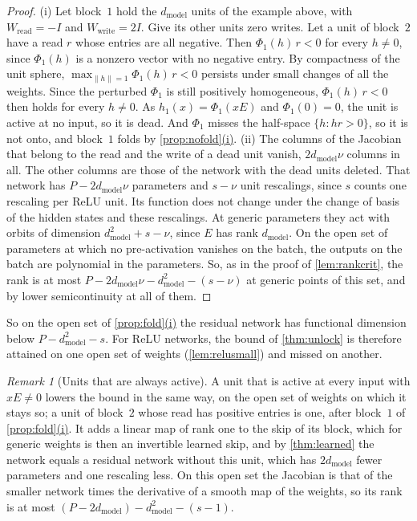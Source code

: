 \documentclass[10pt]{article}
\theoremstyle{definition}
\theoremstyle{remark}
\newtheorem{remark}[theorem]{Remark}
\newcommand{\Wread}{W_{\mathrm{read}}}
\newcommand{\Wwrite}{W_{\mathrm{write}}}
\newcommand{\dm}{d_{\mathrm{model}}}
\newcommand{\norm}[1]{\lVert #1\rVert}
\DeclareRobustCommand{\cpref}[2]{\hyperref[#1:#2]{\cref*{#1}(#2)}}
\begin{document}
\begin{proof}
(i) Let block~$1$ hold the $\dm$ units of the example above, with $\Wread = -I$ and $\Wwrite = 2I$. Give its other units zero writes. Let a unit of block~$2$ have a read $r$ whose entries are all negative. Then $\Phi_1(h)\,r < 0$ for every $h \neq 0$, since $\Phi_1(h)$ is a nonzero vector with no negative entry. By compactness of the unit sphere, $\max_{\norm{h} = 1}\Phi_1(h)\,r < 0$ persists under small changes of all the weights. Since the perturbed $\Phi_1$ is still positively homogeneous, $\Phi_1(h)\,r < 0$ then holds for every $h \neq 0$. As $h_1(x) = \Phi_1(xE)$ and $\Phi_1(0) = 0$, the unit is active at no input, so it is dead. And $\Phi_1$ misses the half-space $\{h : hr > 0\}$, so it is not onto, and block~$1$ folds by \cpref{prop:nofold}{i}.
(ii) The columns of the Jacobian that belong to the read and the write of a dead unit vanish, $2\dm\nu$ columns in all. The other columns are those of the network with the dead units deleted. That network has $P - 2\dm\nu$ parameters and $s - \nu$ unit rescalings, since $s$ counts one rescaling per ReLU unit. Its function does not change under the change of basis of the hidden states and these rescalings. At generic parameters they act with orbits of dimension $\dm^2 + s - \nu$, since $E$ has rank $\dm$. On the open set of parameters at which no pre-activation vanishes on the batch, the outputs on the batch are polynomial in the parameters. So, as in the proof of \cref{lem:rankcrit}, the rank is at most $P - 2\dm\nu - \dm^2 - (s - \nu)$ at generic points of this set, and by lower semicontinuity at all of them.
\end{proof}

So on the open set of \cpref{prop:fold}{i} the residual network has functional dimension below $P - \dm^2 - s$. For ReLU networks, the bound of \cref{thm:unlock} is therefore attained on one open set of weights (\cref{lem:relusmall}) and missed on another.

\begin{remark}[Units that are always active]\label{rem:alwayson}
A unit that is active at every input with $xE \neq 0$ lowers the bound in the same way, on the open set of weights on which it stays so; a unit of block~$2$ whose read has positive entries is one, after block~$1$ of \cpref{prop:fold}{i}. It adds a linear map of rank one to the skip of its block, which for generic weights is then an invertible learned skip, and by \cref{thm:learned} the network equals a residual network without this unit, which has $2\dm$ fewer parameters and one rescaling less. On this open set the Jacobian is that of the smaller network times the derivative of a smooth map of the weights, so its rank is at most $(P - 2\dm) - \dm^2 - (s - 1)$.
\end{remark}
\end{document}
